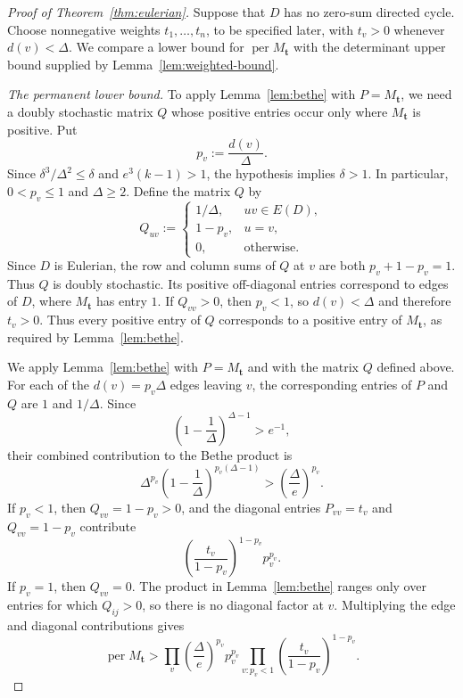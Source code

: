 \documentclass[11pt]{amsart}
\theoremstyle{remark}
\newcommand{\per}{\operatorname{per}}
\begin{document}
\begin{proof}[Proof of Theorem~\ref{thm:eulerian}]
Suppose that $D$ has no zero-sum directed cycle.  Choose nonnegative
weights $t_1,\ldots,t_n$, to be specified later, with $t_v>0$ whenever
$d(v)<\Delta$.  We compare a lower bound for $\per M_{\mathbf t}$ with
the determinant upper bound supplied by Lemma~\ref{lem:weighted-bound}.

\medskip\noindent
\emph{The permanent lower bound.}
To apply Lemma~\ref{lem:bethe} with $P=M_{\mathbf t}$, we need a
doubly stochastic matrix $Q$ whose positive entries occur only where
$M_{\mathbf t}$ is positive.  Put
\[
  p_v:=\frac{d(v)}\Delta.
\]
Since $\delta^3/\Delta^2\le\delta$ and $e^3(k-1)>1$, the hypothesis
implies $\delta>1$.  In particular, $0<p_v\le1$ and $\Delta\ge2$.
Define the matrix $Q$ by
\[
  Q_{uv}:=
  \begin{cases}
    1/\Delta,&uv\in E(D),\\
    1-p_v,&u=v,\\
    0,&\text{otherwise}.
  \end{cases}
\]
Since $D$ is Eulerian, the row and column sums of $Q$ at $v$ are both
$p_v+1-p_v=1$.
Thus $Q$ is doubly stochastic.
Its positive off-diagonal entries correspond to edges of $D$, where
$M_{\mathbf t}$ has entry $1$.  If $Q_{vv}>0$, then $p_v<1$, so
$d(v)<\Delta$ and therefore $t_v>0$.  Thus every positive entry of
$Q$ corresponds to a positive entry of $M_{\mathbf t}$, as required by
Lemma~\ref{lem:bethe}.

We apply Lemma~\ref{lem:bethe} with $P=M_{\mathbf t}$ and with the
matrix $Q$ defined above.  For each of the $d(v)=p_v\Delta$ edges
leaving $v$, the corresponding entries of $P$ and $Q$ are $1$ and
$1/\Delta$.  Since
\[
  \left(1-\frac1\Delta\right)^{\Delta-1}>e^{-1},
\]
their combined contribution to the Bethe product is
\[
  \Delta^{p_v}
  \left(1-\frac1\Delta\right)^{p_v(\Delta-1)}
  >\left(\frac{\Delta}{e}\right)^{p_v}.
\]
If $p_v<1$, then $Q_{vv}=1-p_v>0$, and the diagonal entries
$P_{vv}=t_v$ and $Q_{vv}=1-p_v$ contribute
\[
  \left(\frac{t_v}{1-p_v}\right)^{1-p_v}p_v^{p_v}.
\]
If $p_v=1$, then $Q_{vv}=0$.  The product in
Lemma~\ref{lem:bethe} ranges only over entries for which $Q_{ij}>0$,
so there is no diagonal factor at $v$.  Multiplying the edge and
diagonal contributions gives
\begin{equation}\label{eq:bethe-lower}
  \per M_{\mathbf t}
  >
  \prod_v
  \left(\frac{\Delta}{e}\right)^{p_v}p_v^{p_v}
  \prod_{v:p_v<1}
  \left(\frac{t_v}{1-p_v}\right)^{1-p_v}.
\end{equation}


\end{proof}
\end{document}
